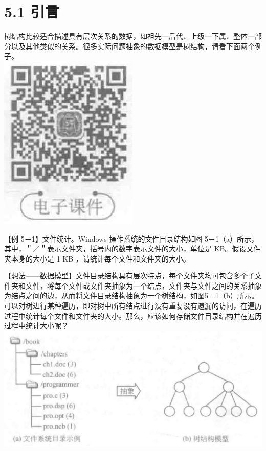 \documentclass[10pt]{article}
\begin{document}
\section*{5.1 引言}
树结构比较适合描述具有层次关系的数据，如祖先一后代、上级一下属、整体一部分以及其他类似的关系。很多实际问题抽象的数据模型是树结构，请看下面两个例子。\\
\includegraphics[max width=\textwidth, center]{2025_06_06_704745ea57b15b2333e5g-141}

【例 5－1】文件统计。Windows 操作系统的文件目录结构如图 5－1（a）所示，其中，＂／＂表示文件夹，括号内的数字表示文件的大小，单位是 KB。假设文件夹本身的大小是 1 KB ，请统计每个文件和文件夹的大小。

【想法——数据模型】文件目录结构具有层次特点，每个文件夹均可包含多个子文件夹和文件，将每个文件或文件夹抽象为一个结点，文件夹与文件之间的关系抽象为结点之间的边，从而将文件目录结构抽象为一个树结构，如图5－1（b）所示。可以对树进行某种遍历，即对树中所有结点进行没有重复没有遗漏的访问，在遍历过程中统计每个文件和文件夹的大小。那么，应该如何存储文件目录结构并在遍历过程中统计大小呢？\\
\includegraphics[max width=\textwidth, center]{2025_06_06_704745ea57b15b2333e5g-141(1)}
\end{document}
